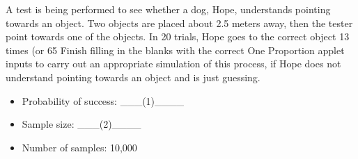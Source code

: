 \documentclass[10pt]{examdesign}
\begin{document}
\begin{multiplechoice}
		\begin{question}
			A test is being performed to see whether a dog, Hope, understands pointing towards an object. Two objects are placed about 2.5 meters away, then the tester point towards one of the objects. In 20 trials, Hope goes to the correct object 13 times (or 65%
			Finish filling in the blanks with the correct One Proportion applet inputs to carry out an appropriate simulation of this process, if Hope does not understand pointing towards an object and is just guessing.
			\begin{itemize}
				\item Probability of success: \_\_\_(1)\_\_\_\_
				\item Sample size: \_\_\_(2)\_\_\_\_
				\item Number of samples: 10,000
			\end{itemize}
		\end{question}
	
	\end{multiplechoice}
	
\end{document}
